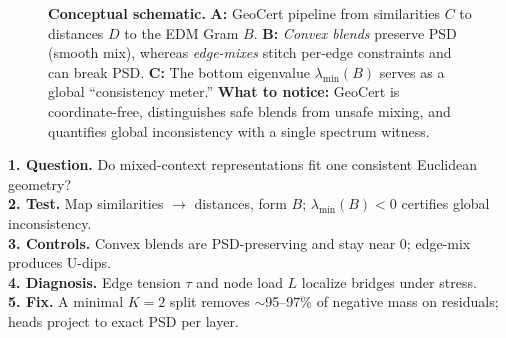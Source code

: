 \documentclass[11pt]{article}
\newcommand{\1}{\mathbf{1}}
\begin{document}
\begin{figure}[t]
\begin{subfigure}[t]{0.32\textwidth}
\end{subfigure}\hfill
\begin{subfigure}[t]{0.32\textwidth}
\centering
{}
\end{subfigure}
\caption{\textbf{Conceptual schematic.} \textbf{A:} GeoCert pipeline from similarities $C$ to distances $D$ to the EDM Gram $B$. \textbf{B:} \emph{Convex blends} preserve PSD (smooth mix), whereas \emph{edge-mixes} stitch per-edge constraints and can break PSD. \textbf{C:} The bottom eigenvalue $\lambda_{\min}(B)$ serves as a global ``consistency meter.'' \textbf{What to notice:} GeoCert is coordinate-free, distinguishes safe blends from unsafe mixing, and quantifies global inconsistency with a single spectrum witness.}
\label{fig:concept}
\end{figure}

\begin{tcolorbox}[colback=gray!5!white,colframe=gray!75!black,title=How to read GeoCert]
\textbf{1. Question.} Do mixed-context representations fit one consistent Euclidean geometry?\\
\textbf{2. Test.} Map similarities $\to$ distances, form $B$; $\lambda_{\min}(B){<}0$ certifies global inconsistency.\\
\textbf{3. Controls.} Convex blends are PSD-preserving and stay near $0$; edge-mix produces U-dips.\\
\textbf{4. Diagnosis.} Edge tension $\tau$ and node load $L$ localize bridges under stress.\\
\textbf{5. Fix.} A minimal $K{=}2$ split removes $\sim$95--97\% of negative mass on residuals; heads project to exact PSD per layer.
\end{tcolorbox}
\end{document}
